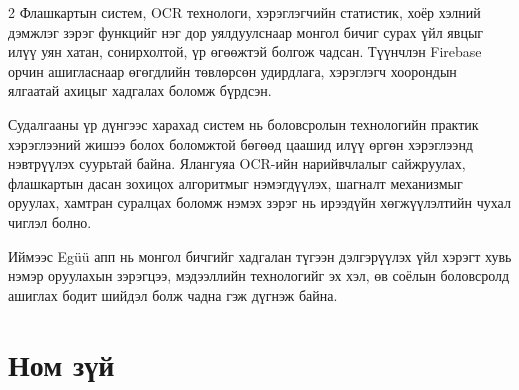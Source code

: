 \begin{multicols}{2}
Флашкартын систем, OCR технологи, хэрэглэгчийн статистик, хоёр хэлний дэмжлэг зэрэг функцийг нэг дор уялдуулснаар монгол бичиг сурах үйл явцыг илүү уян хатан, сонирхолтой, үр өгөөжтэй болгож чадсан. Түүнчлэн Firebase орчин ашигласнаар өгөгдлийн төвлөрсөн удирдлага, хэрэглэгч хоорондын ялгаатай ахицыг хадгалах боломж бүрдсэн.

Судалгааны үр дүнгээс харахад систем нь боловсролын технологийн практик хэрэглээний жишээ болох боломжтой бөгөөд цаашид илүү өргөн хэрэглээнд нэвтрүүлэх суурьтай байна. Ялангуяа OCR-ийн нарийвчлалыг сайжруулах, флашкартын дасан зохицох алгоритмыг нэмэгдүүлэх, шагналт механизмыг оруулах, хамтран суралцах боломж нэмэх зэрэг нь ирээдүйн хөгжүүлэлтийн чухал чиглэл болно.

Иймээс Egüü апп нь монгол бичгийг хадгалан түгээн дэлгэрүүлэх үйл хэрэгт хувь нэмэр оруулахын зэрэгцээ, мэдээллийн технологийг эх хэл, өв соёлын боловсролд ашиглах бодит шийдэл болж чадна гэж дүгнэж байна.

\vspace{-12pt}
\enlargethispage{2\baselineskip}
\section*{Ном зүй}
\vspace{-6pt}
{\scriptsize
\printbibliography[heading=none]
}
\end{multicols}

